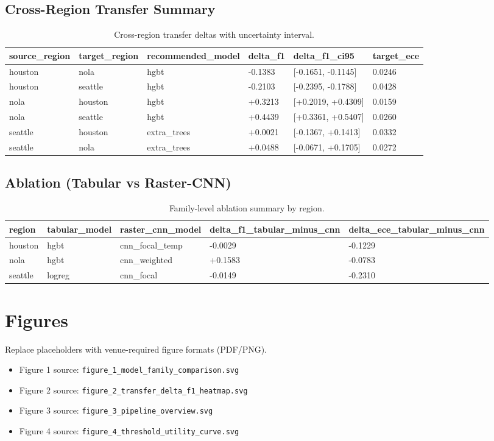 \documentclass[11pt]{article}
\begin{document}
\subsection{Cross-Region Transfer Summary}
\begin{table}[H]
\centering
\begin{tabular}{llllll}
\hline
source\_region & target\_region & recommended\_model & delta\_f1 & delta\_f1\_ci95 & target\_ece \\
\hline
houston & nola & hgbt & -0.1383 & [-0.1651, -0.1145] & 0.0246 \\
houston & seattle & hgbt & -0.2103 & [-0.2395, -0.1788] & 0.0428 \\
nola & houston & hgbt & +0.3213 & [+0.2019, +0.4309] & 0.0159 \\
nola & seattle & hgbt & +0.4439 & [+0.3361, +0.5407] & 0.0260 \\
seattle & houston & extra\_trees & +0.0021 & [-0.1367, +0.1413] & 0.0332 \\
seattle & nola & extra\_trees & +0.0488 & [-0.0671, +0.1705] & 0.0272 \\
\hline
\end{tabular}
\caption{Cross-region transfer deltas with uncertainty interval.}
\end{table}
\subsection{Ablation (Tabular vs Raster-CNN)}
\begin{table}[H]
\centering
\begin{tabular}{lllll}
\hline
region & tabular\_model & raster\_cnn\_model & delta\_f1\_tabular\_minus\_cnn & delta\_ece\_tabular\_minus\_cnn \\
\hline
houston & hgbt & cnn\_focal\_temp & -0.0029 & -0.1229 \\
nola & hgbt & cnn\_weighted & +0.1583 & -0.0783 \\
seattle & logreg & cnn\_focal & -0.0149 & -0.2310 \\
\hline
\end{tabular}
\caption{Family-level ablation summary by region.}
\end{table}
\section{Figures}
Replace placeholders with venue-required figure formats (PDF/PNG).
\begin{itemize}
\item Figure 1 source: \texttt{figure\_1\_model\_family\_comparison.svg}
\item Figure 2 source: \texttt{figure\_2\_transfer\_delta\_f1\_heatmap.svg}
\item Figure 3 source: \texttt{figure\_3\_pipeline\_overview.svg}
\item Figure 4 source: \texttt{figure\_4\_threshold\_utility\_curve.svg}
\end{itemize}
\end{document}
